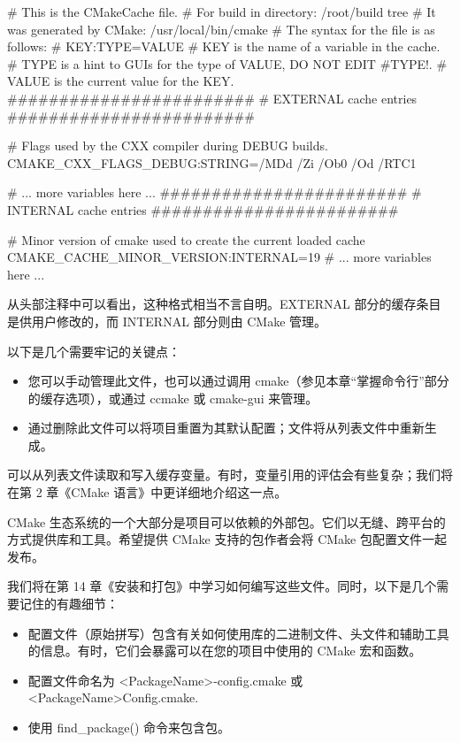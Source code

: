 \begin{shell}
# This is the CMakeCache file.
# For build in directory: /root/build tree
# It was generated by CMake: /usr/local/bin/cmake
# The syntax for the file is as follows:
# KEY:TYPE=VALUE
# KEY is the name of a variable in the cache.
# TYPE is a hint to GUIs for the type of VALUE, DO NOT EDIT
  #TYPE!.
# VALUE is the current value for the KEY.
########################
# EXTERNAL cache entries
########################

# Flags used by the CXX compiler during DEBUG builds.
CMAKE_CXX_FLAGS_DEBUG:STRING=/MDd /Zi /Ob0 /Od /RTC1

# ... more variables here ...
########################
# INTERNAL cache entries
########################

# Minor version of cmake used to create the current loaded cache
CMAKE_CACHE_MINOR_VERSION:INTERNAL=19
# ... more variables here ...
\end{shell}

从头部注释中可以看出，这种格式相当不言自明。EXTERNAL 部分的缓存条目是供用户修改的，而 INTERNAL 部分则由 CMake 管理。

以下是几个需要牢记的关键点：

\begin{itemize}
\item
您可以手动管理此文件，也可以通过调用 cmake（参见本章“掌握命令行”部分的缓存选项），或通过 ccmake 或 cmake-gui 来管理。

\item
通过删除此文件可以将项目重置为其默认配置；文件将从列表文件中重新生成。
\end{itemize}

可以从列表文件读取和写入缓存变量。有时，变量引用的评估会有些复杂；我们将在第 2 章《CMake 语言》中更详细地介绍这一点。


CMake 生态系统的一个大部分是项目可以依赖的外部包。它们以无缝、跨平台的方式提供库和工具。希望提供 CMake 支持的包作者会将 CMake 包配置文件一起发布。

我们将在第 14 章《安装和打包》中学习如何编写这些文件。同时，以下是几个需要记住的有趣细节：

\begin{itemize}
\item
配置文件（原始拼写）包含有关如何使用库的二进制文件、头文件和辅助工具的信息。有时，它们会暴露可以在您的项目中使用的 CMake 宏和函数。

\item
配置文件命名为 <PackageName>-config.cmake 或 <PackageName>Config.cmake.

\item
使用 find\_package() 命令来包含包。
\end{itemize}

